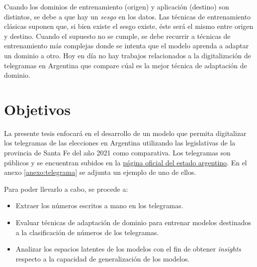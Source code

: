 Cuando los dominios de entrenamiento (origen) y aplicaci\'on (destino) son distintos, se debe a que hay un {\it sesgo}
en los datos. Las t\'ecnicas de entrenamiento cl\'asicas suponen que, si bien existe el sesgo existe, \'este ser\'a el
mismo entre origen y destino. Cuando el supuesto no se cumple, se debe recurrir a t\'ecnicas de entrenamiento m\'as
complejas donde se intenta que el modelo aprenda a adaptar un dominio a otro. Hoy en d\'ia no hay trabajos relacionados
a la digitalizaci\'on de telegramas en Argentina que compare c\'ual es la mejor t\'ecnica de adaptaci\'on de dominio.

\section{Objetivos}

La presente tesis enfocar\'a en el desarrollo de un modelo que permita digitalizar los telegramas de las elecciones en
Argentina utilizando las legislativas de la provincia de Santa Fe del a\~{n}o 2021 como comparativa. Los telegramas son
p\'ublicos y se encuentran subidos en la \href{https://op.elecciones.gob.ar/telegramas/generales2021/}{p\'agina oficial
    del estado argentino}. En el anexo \ref{anexo:telegrama} se adjunta un ejemplo de uno de ellos.

Para poder llevarlo a cabo, se procede a:
\begin{itemize}
    \item Extraer los n\'umeros escritos a mano en los telegramas.
    \item Evaluar t\'ecnicas de adaptaci\'on de dominio para entrenar modelos destinados a la clasificaci\'on de n\'umeros de los
          telegramas.
    \item Analizar los espacios latentes de los modelos con el fin de obtener {\it insights} respecto a la capacidad de
          generalizaci\'on de los modelos.
\end{itemize}